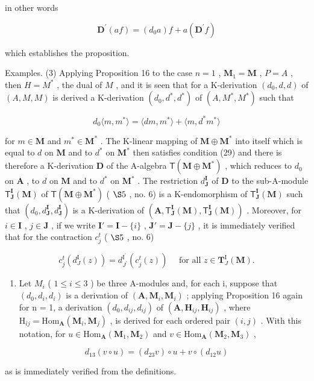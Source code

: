 in other words

\[
\mathbf {D} ^ {\prime} (a f) = \left(d _ {0} a\right) f + a (\mathbf {D} ^ {\prime} f)
\]

which establishes the proposition.

Examples. (3) Applying Proposition 16 to the case \(n = 1\) , \(\mathbf{M}_1 = \mathbf{M}\) , \(P = A\) , then \(H = M^*\) , the dual of \(M\) , and it is seen that for a K-derivation \((d_0, d, d)\) of \((A, M, M)\) is derived a K-derivation \((d_0, d^*, d^*)\) of \((A, M^*, M^*)\) such that

\[
d _ {0} \langle m, m ^ {*} \rangle = \langle d m, m ^ {*} \rangle + \langle m, d ^ {*} m ^ {*} \rangle\tag{38}
\]

for \(m \in \mathbf{M}\) and \(m^* \in \mathbf{M}^*\) . The K-linear mapping of \(\mathbf{M} \oplus \mathbf{M}^*\) into itself which is equal to \(d\) on \(\mathbf{M}\) and to \(d^{*}\) on \(\mathbf{M}^{*}\) then satisfies condition (29) and there is therefore a K-derivation \(\mathbf{D}\) of the A-algebra \(\mathsf{T}(\mathbf{M} \oplus \mathbf{M}^{*})\) , which reduces to \(d_{0}\) on \(\mathbf{A}\) , to \(d\) on \(\mathbf{M}\) and to \(d^{*}\) on \(\mathbf{M}^{*}\) . The restriction \(d_{\mathbf{J}}^{\mathbf{I}}\) of \(\mathbf{D}\) to the sub-A-module \(\mathsf{T}_{\mathbf{J}}^{\mathbf{I}}(\mathbf{M})\) of \(\mathsf{T}(\mathbf{M} \oplus \mathbf{M}^{*})\) ( \(\S 5\) , no. 6) is a K-endomorphism of \(\mathsf{T}_{\mathbf{J}}^{\mathbf{I}}(\mathbf{M})\) such that \((d_{0}, d_{\mathbf{J}}^{\mathbf{I}}, d_{\mathbf{J}}^{\mathbf{I}})\) is a K-derivation of \((\mathbf{A}, \mathsf{T}_{\mathbf{J}}^{\mathbf{I}}(\mathbf{M}), \mathsf{T}_{\mathbf{J}}^{\mathbf{I}}(\mathbf{M}))\) . Moreover, for \(i \in \mathbf{I}\) , \(j \in \mathbf{J}\) , if we write \(\mathbf{I}' = \mathbf{I} - \{i\}\) , \(\mathbf{J}' = \mathbf{J} - \{j\}\) , it is immediately verified that for the contraction \(c_{j}^{t}\) ( \(\S 5\) , no. 6)

\[
c _ {j} ^ {t} (d _ {J} ^ {\mathrm{I}} (z)) = d _ {J ^ {\prime}} ^ {\mathrm{I} ^ {\prime}} (c _ {j} ^ {t} (z)) \quad \text { for   all } z \in \mathbf {T} _ {J} ^ {\mathrm{I}} (\mathbf {M}).
\]

\begin{enumerate}
\def\labelenumi{(\arabic{enumi})}
\setcounter{enumi}{3}
\tightlist
\item
  Let \(M_{i}\) ( \(1 \leqslant i \leqslant 3\) ) be three A-modules and, for each i, suppose that \((d_{0}, d_{i}, d_{i})\) is a derivation of \((\mathbf{A}, \mathbf{M}_{i}, \mathbf{M}_{i})\) ; applying Proposition 16 again for n = 1, a derivation \((d_{0}, d_{ij}, d_{ij})\) of \((\mathbf{A}, \mathbf{H}_{ij}, \mathbf{H}_{ij})\) , where \(\mathrm{H}_{ij} = \mathrm{Hom}_{\mathbf{A}}(\mathbf{M}_{i}, \mathbf{M}_{j})\) , is derived for each ordered pair \((i, j)\) . With this notation, for \(u \in \mathrm{Hom}_{\mathbf{A}}(\mathbf{M}_{1}, \mathbf{M}_{2})\) and \(v \in \mathrm{Hom}_{\mathbf{A}}(\mathbf{M}_{2}, \mathbf{M}_{3})\) ,
\end{enumerate}

\[
d _ {1 3} (v \circ u) = (d _ {2 3} v) \circ u + v \circ (d _ {1 2} u)\tag{39}
\]

as is immediately verified from the definitions.


